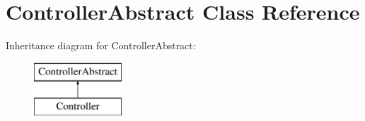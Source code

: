 \hypertarget{class_anemo_1_1_controller_1_1_controller_abstract}{
\section{ControllerAbstract Class Reference}
\label{class_anemo_1_1_controller_1_1_controller_abstract}
}
Inheritance diagram for ControllerAbstract:\begin{figure}[H]
\begin{center}
\leavevmode
\includegraphics[height=2.000000cm]{class_anemo_1_1_controller_1_1_controller_abstract}
\end{center}
\end{figure}
